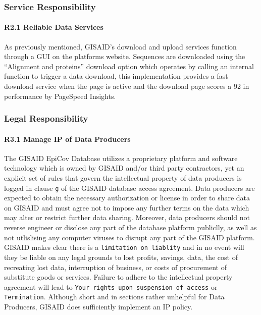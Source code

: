 \documentclass{article}
\begin{document}
\hypertarget{service-responsibility-1}{%
\subsubsection{Service Responsibility}\label{service-responsibility-1}}

\hypertarget{r2.1-reliable-data-services}{%
\paragraph{R2.1 Reliable Data
Services}\label{r2.1-reliable-data-services}}

As previously mentioned, GISAID's download and upload services function
through a GUI on the platforms website. Sequences are downloaded using
the ``Alignment and proteins'' download option which operates by calling
an internal function to trigger a data download, this implementation
provides a fast download service when the page is active and the
download page scores a 92 in performance by PageSpeed Insights.

\hypertarget{legal-responsibility-1}{%
\subsubsection{Legal Responsibility}\label{legal-responsibility-1}}

\hypertarget{r3.1-manage-ip-of-data-producers}{%
\paragraph{R3.1 Manage IP of Data
Producers}\label{r3.1-manage-ip-of-data-producers}}

The GISAID EpiCov Database utilizes a proprietary platform and software
technology which is owned by GISAID and/or third party contractors, yet
an explicit set of rules that govern the intellectual property of data
producers is logged in clause \texttt{g} of the GISAID database access
agreement. Data producers are expected to obtain the necessary
authorization or license in order to share data on GISAID and must agree
not to impose any further terms on the data which may alter or restrict
further data sharing. Moreover, data producers should not reverse
engineer or disclose any part of the database platform publiclly, as
well as not utlislising any computer viruses to disrupt any part of the
GISAID platform. GISAID makes clear there is a
\texttt{limitation\ on\ liablity} and in no event will they be liable on
any legal grounds to lost profits, savings, data, the cost of recreating
lost data, interruption of business, or costs of procurement of
substitute goods or services. Failure to adhere to the intellectual
property agreement will lead to
\texttt{Your\ rights\ upon\ suspension\ of\ access} or
\texttt{Termination}. Although short and in sections rather unhelpful
for Data Producers, GISAID does sufficiently implement an IP policy.
\end{document}
